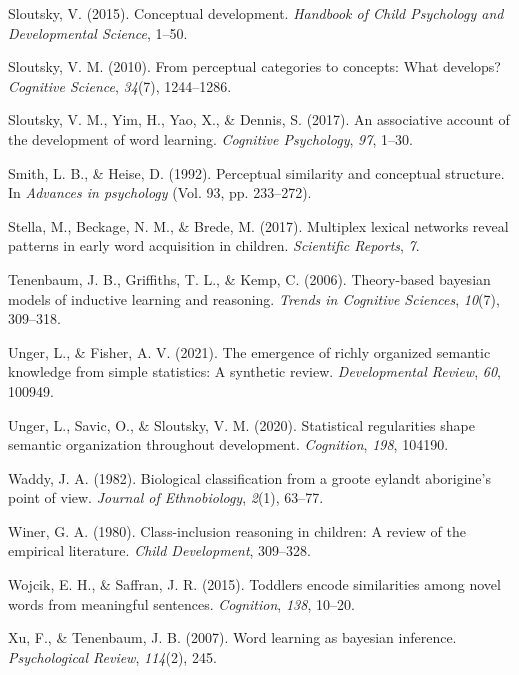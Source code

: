 \documentclass[english,,man]{apa6}
\begin{document}
\leavevmode\hypertarget{ref-sloutsky2015}{}%
Sloutsky, V. (2015). Conceptual development. \emph{Handbook of Child Psychology and Developmental Science}, 1--50.

\leavevmode\hypertarget{ref-sloutsky2010}{}%
Sloutsky, V. M. (2010). From perceptual categories to concepts: What develops? \emph{Cognitive Science}, \emph{34}(7), 1244--1286.

\leavevmode\hypertarget{ref-sloutsky2017}{}%
Sloutsky, V. M., Yim, H., Yao, X., \& Dennis, S. (2017). An associative account of the development of word learning. \emph{Cognitive Psychology}, \emph{97}, 1--30.

\leavevmode\hypertarget{ref-smith1992}{}%
Smith, L. B., \& Heise, D. (1992). Perceptual similarity and conceptual structure. In \emph{Advances in psychology} (Vol. 93, pp. 233--272).

\leavevmode\hypertarget{ref-stella2017}{}%
Stella, M., Beckage, N. M., \& Brede, M. (2017). Multiplex lexical networks reveal patterns in early word acquisition in children. \emph{Scientific Reports}, \emph{7}.

\leavevmode\hypertarget{ref-tenenbaum2006theory}{}%
Tenenbaum, J. B., Griffiths, T. L., \& Kemp, C. (2006). Theory-based bayesian models of inductive learning and reasoning. \emph{Trends in Cognitive Sciences}, \emph{10}(7), 309--318.

\leavevmode\hypertarget{ref-unger2021}{}%
Unger, L., \& Fisher, A. V. (2021). The emergence of richly organized semantic knowledge from simple statistics: A synthetic review. \emph{Developmental Review}, \emph{60}, 100949.

\leavevmode\hypertarget{ref-unger2020statistical}{}%
Unger, L., Savic, O., \& Sloutsky, V. M. (2020). Statistical regularities shape semantic organization throughout development. \emph{Cognition}, \emph{198}, 104190.

\leavevmode\hypertarget{ref-waddy1982}{}%
Waddy, J. A. (1982). Biological classification from a groote eylandt aborigine's point of view. \emph{Journal of Ethnobiology}, \emph{2}(1), 63--77.

\leavevmode\hypertarget{ref-winer1980class}{}%
Winer, G. A. (1980). Class-inclusion reasoning in children: A review of the empirical literature. \emph{Child Development}, 309--328.

\leavevmode\hypertarget{ref-wojcik2015}{}%
Wojcik, E. H., \& Saffran, J. R. (2015). Toddlers encode similarities among novel words from meaningful sentences. \emph{Cognition}, \emph{138}, 10--20.

\leavevmode\hypertarget{ref-xu2007word}{}%
Xu, F., \& Tenenbaum, J. B. (2007). Word learning as bayesian inference. \emph{Psychological Review}, \emph{114}(2), 245.
\end{document}
